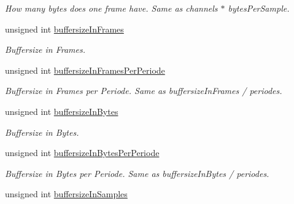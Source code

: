 \begin{DoxyCompactItemize}
\begin{DoxyCompactList}\small\item\em How many bytes does one frame have. Same as channels $\ast$ bytes\+Per\+Sample. \end{DoxyCompactList}\item 
\hypertarget{structNl_1_1SampleSpecs__t_a75bc6827d492e7fe609c0909b7267cd7}{}unsigned int \hyperlink{structNl_1_1SampleSpecs__t_a75bc6827d492e7fe609c0909b7267cd7}{buffersize\+In\+Frames}\label{structNl_1_1SampleSpecs__t_a75bc6827d492e7fe609c0909b7267cd7}

\begin{DoxyCompactList}\small\item\em Buffersize in Frames. \end{DoxyCompactList}\item 
\hypertarget{structNl_1_1SampleSpecs__t_aabb54121ced216ad67e433511120bbf9}{}unsigned int \hyperlink{structNl_1_1SampleSpecs__t_aabb54121ced216ad67e433511120bbf9}{buffersize\+In\+Frames\+Per\+Periode}\label{structNl_1_1SampleSpecs__t_aabb54121ced216ad67e433511120bbf9}

\begin{DoxyCompactList}\small\item\em Buffersize in Frames per Periode. Same as buffersize\+In\+Frames / periodes. \end{DoxyCompactList}\item 
\hypertarget{structNl_1_1SampleSpecs__t_a1a77d04539b8d1818b8feab9b12179af}{}unsigned int \hyperlink{structNl_1_1SampleSpecs__t_a1a77d04539b8d1818b8feab9b12179af}{buffersize\+In\+Bytes}\label{structNl_1_1SampleSpecs__t_a1a77d04539b8d1818b8feab9b12179af}

\begin{DoxyCompactList}\small\item\em Buffersize in Bytes. \end{DoxyCompactList}\item 
\hypertarget{structNl_1_1SampleSpecs__t_a0457ca189e401b4b3e96f1accb9d4320}{}unsigned int \hyperlink{structNl_1_1SampleSpecs__t_a0457ca189e401b4b3e96f1accb9d4320}{buffersize\+In\+Bytes\+Per\+Periode}\label{structNl_1_1SampleSpecs__t_a0457ca189e401b4b3e96f1accb9d4320}

\begin{DoxyCompactList}\small\item\em Buffersize in Bytes per Periode. Same as buffersize\+In\+Bytes / periodes. \end{DoxyCompactList}\item 
\hypertarget{structNl_1_1SampleSpecs__t_ac0875153467c6ea4091a96975e344386}{}unsigned int \hyperlink{structNl_1_1SampleSpecs__t_ac0875153467c6ea4091a96975e344386}{buffersize\+In\+Samples}\label{structNl_1_1SampleSpecs__t_ac0875153467c6ea4091a96975e344386}


\end{DoxyCompactItemize}
